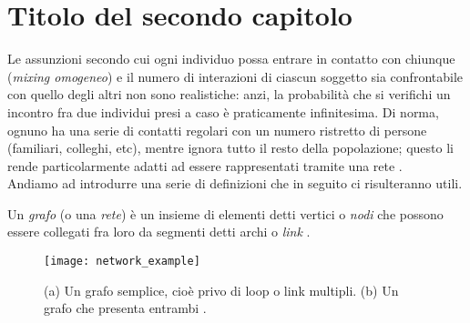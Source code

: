 \chapter{Titolo del secondo capitolo}
\label{chap:cap2}

Le assunzioni secondo cui ogni individuo possa entrare in contatto con chiunque (\emph{mixing omogeneo}) e il numero di interazioni di ciascun soggetto sia confrontabile con quello degli altri non sono realistiche: anzi, la probabilità che si verifichi un incontro fra due individui presi a caso è praticamente infinitesima. Di norma, ognuno ha una serie di contatti regolari con un numero ristretto di persone (familiari, colleghi, etc), mentre ignora tutto il resto della popolazione; questo li rende particolarmente adatti ad essere rappresentati tramite una rete \cite{Barabasi}. \\

\medskip 
Andiamo ad introdurre una serie di definizioni che in seguito ci risulteranno utili. \\
\begin{definizione}
Un \emph{grafo} (o una \emph{rete}) è un insieme di elementi detti vertici o \emph{nodi} che possono essere collegati fra loro da segmenti detti archi o \emph{link} \cite{Bickle}.
\end{definizione}
\begin{figure}
		\begin{center}
			\texttt{[image: network\_example]}
			\caption{(a) Un grafo semplice, cioè privo di loop o link multipli. (b) Un grafo che presenta entrambi \cite{Newman}.}
			\label{fig:net_ex}
		\end{center}
	\end{figure}
	

